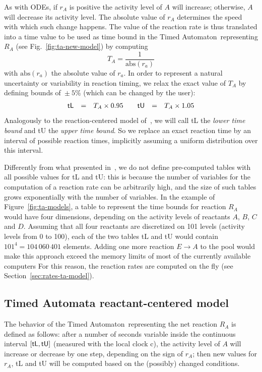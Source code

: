 \documentclass{llncs}
\newcommand{\ta}{Timed Automaton}
\begin{document}
As with ODEs, if $r_A$ is positive the activity level of $A$ will increase;
otherwise, $A$ will decrease its activity level.
The absolute value of $r_A$ determines the speed with which such change happens.
The value of the reaction rate is thus translated into a time value to be used as
time bound in the \ta\ representing $R_A$ (see Fig.~\ref{fig:ta-new-model}) by computing
$$T_A = \frac{1}{\mbox{abs}(r_a)}$$
with $\mbox{abs}(r_a)$ the absolute value of $r_a$. In order to represent
a natural uncertainty or variability in reaction timing, we relax the exact value of $T_A$ by
defining bounds of~$\pm~5\%$ (which can be changed by the user):
$$
\begin{array}{lcllcl}
  \mbox{\sf tL} &=& T_A \times 0.95 \qquad
  \mbox{\sf tU} &=& T_A \times 1.05
\end{array}
$$
Analogously to the reaction-centered model of~\cite{animo-ieee},
we will call {\sf tL} the \emph{lower time bound} and {\sf tU} the \emph{upper time bound}.
So we replace an exact reaction time by an interval of possible reaction times,
implicitly assuming a uniform distribution over this interval.

Differently from what presented in~\cite{animo-ieee}, we do not define
pre-computed tables with all possible values for {\sf tL} and {\sf tU}: this is because
the number of variables for the computation of a reaction rate can be arbitrarily high, and
the size of such tables grows exponentially with the number of variables.
In the example of Figure~\ref{fig:ta-models}, a table to represent the time bounds
for reaction ${R_A}$ would have four dimensions, depending on the activity levels
of reactants $A$, $B$, $C$ and $D$. Assuming that all four reactants are discretized
on 101 levels (activity levels from 0 to 100), each of the two tables {\sf tL} and {\sf tU} would contain $101^4 = 104\,060\,401$
elements. Adding one more reaction $E \rightarrow A$ to the pool would make
this approach exceed the memory limits of most of the currently available computers
For this reason, the reaction rates are computed on the fly (see Section~\ref{sec:rates-ta-model}).


\subsection{Timed Automata reactant-centered model}\label{sec:ta-model}
The behavior of the \ta\ representing the net reaction $R_A$ is defined as follows: after a number of seconds
variable inside the continuous interval $[\mbox{\sf tL}, \mbox{\sf tU}]$ (measured with the local clock {\sf c}),
the activity level of $A$ will increase or
decrease by one step, depending on the sign of $r_A$; then new values for $r_A$, {\sf tL} and {\sf tU} will be computed based
on the (possibly) changed conditions.
\end{document}
